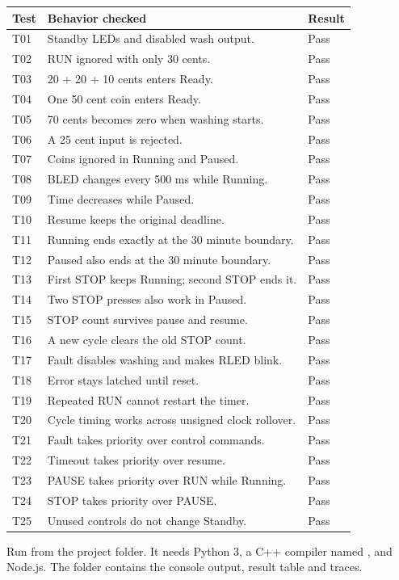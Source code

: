 \vspace{4pt}
{\small
\begin{tabularx}{\linewidth}{@{}p{0.95cm}Yp{1.4cm}@{}}
\toprule
Test & Behavior checked & Result\\
\midrule
T01 & Standby LEDs and disabled wash output. & Pass\\
T02 & RUN ignored with only 30 cents. & Pass\\
T03 & 20 + 20 + 10 cents enters Ready. & Pass\\
T04 & One 50 cent coin enters Ready. & Pass\\
T05 & 70 cents becomes zero when washing starts. & Pass\\
T06 & A 25 cent input is rejected. & Pass\\
T07 & Coins ignored in Running and Paused. & Pass\\
T08 & BLED changes every 500 ms while Running. & Pass\\
T09 & Time decreases while Paused. & Pass\\
T10 & Resume keeps the original deadline. & Pass\\
T11 & Running ends exactly at the 30 minute boundary. & Pass\\
T12 & Paused also ends at the 30 minute boundary. & Pass\\
T13 & First STOP keeps Running; second STOP ends it. & Pass\\
T14 & Two STOP presses also work in Paused. & Pass\\
T15 & STOP count survives pause and resume. & Pass\\
T16 & A new cycle clears the old STOP count. & Pass\\
T17 & Fault disables washing and makes RLED blink. & Pass\\
T18 & Error stays latched until reset. & Pass\\
T19 & Repeated RUN cannot restart the timer. & Pass\\
T20 & Cycle timing works across unsigned clock rollover. & Pass\\
T21 & Fault takes priority over control commands. & Pass\\
T22 & Timeout takes priority over resume. & Pass\\
T23 & PAUSE takes priority over RUN while Running. & Pass\\
T24 & STOP takes priority over PAUSE. & Pass\\
T25 & Unused controls do not change Standby. & Pass\\
\bottomrule
\end{tabularx}}

\vspace{3pt}
Run  from the project folder.
It needs Python 3, a C++ compiler named , and Node.js.
The  folder contains the console output, result table and traces.

